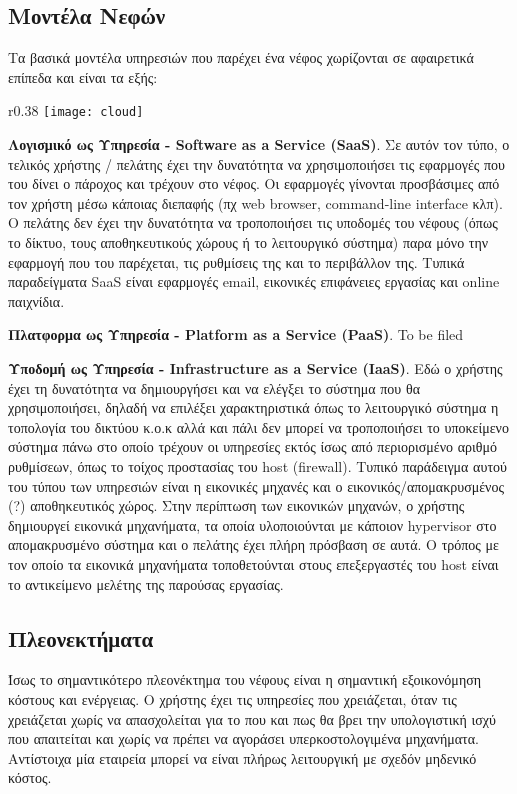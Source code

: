 \subsection{Μοντέλα Νεφών}
Τα βασικά μοντέλα υπηρεσιών που παρέχει ένα νέφος χωρίζονται σε αφαιρετικά
επίπεδα και είναι τα εξής:

\begin{wrapfigure}{r}{0.38\textwidth}
	\centering
	\texttt{[image: cloud]}
\end{wrapfigure}

\textbf{Λογισμικό ως Υπηρεσία - Software as a Service (SaaS)}. Σε αυτόν τον
τύπο, ο τελικός χρήστης / πελάτης έχει την δυνατότητα να χρησιμοποιήσει τις
εφαρμογές που του δίνει ο πάροχος και τρέχουν στο νέφος. Οι εφαρμογές γίνονται
προσβάσιμες από τον χρήστη μέσω κάποιας διεπαφής (πχ web browser, command-line
interface κλπ). Ο πελάτης δεν έχει την δυνατότητα να τροποποιήσει τις υποδομές
του νέφους (όπως το δίκτυο, τους αποθηκευτικούς χώρους ή το λειτουργικό σύστημα)
παρα μόνο την εφαρμογή που του παρέχεται, τις ρυθμίσεις της και το περιβάλλον
της. Τυπικά παραδείγματα SaaS είναι εφαρμογές email, εικονικές επιφάνειες
εργασίας και online παιχνίδια.

\textbf{Πλατφορμα ως Υπηρεσία - Platform as a Service (PaaS)}. %
To be filed

\textbf{Υποδομή ως Υπηρεσία - Infrastructure as a Service (IaaS)}. Εδώ ο
χρήστης έχει τη δυνατότητα να δημιουργήσει και να ελέγξει το σύστημα που θα
χρησιμοποιήσει, δηλαδή να επιλέξει χαρακτηριστικά όπως το λειτουργικό σύστημα η
τοπολογία του δικτύου κ.ο.κ αλλά και πάλι δεν μπορεί να τροποποιήσει το
υποκείμενο σύστημα πάνω στο οποίο τρέχουν οι υπηρεσίες εκτός ίσως από
περιορισμένο αριθμό ρυθμίσεων, όπως το τοίχος προστασίας του host (firewall).
Τυπικό παράδειγμα αυτού του τύπου των υπηρεσιών είναι η εικονικές μηχανές και ο
εικονικός/απομακρυσμένος (?) αποθηκευτικός χώρος. Στην περίπτωση των εικονικών
μηχανών, ο χρήστης δημιουργεί εικονικά μηχανήματα, τα οποία υλοποιούνται με
κάποιον hypervisor στο απομακρυσμένο σύστημα και ο πελάτης έχει πλήρη πρόσβαση
σε αυτά. Ο τρόπος με τον οποίο τα εικονικά μηχανήματα τοποθετούνται στους
επεξεργαστές του host είναι το αντικείμενο μελέτης της παρούσας εργασίας.

\subsection{Πλεονεκτήματα}
Ίσως το σημαντικότερο πλεονέκτημα του νέφους είναι η σημαντική εξοικονόμηση κόστους
και ενέργειας. Ο χρήστης έχει τις υπηρεσίες που χρειάζεται, όταν τις χρειάζεται
χωρίς να απασχολείται για το που και πως θα βρει την υπολογιστική ισχύ που
απαιτείται και χωρίς να πρέπει να αγοράσει υπερκοστολογιμένα μηχανήματα.
Αντίστοιχα μία εταιρεία μπορεί να είναι πλήρως λειτουργική με σχεδόν μηδενικό
κόστος.


